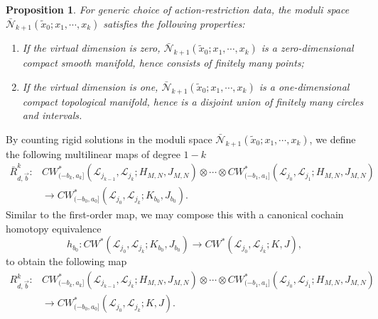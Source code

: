 \documentclass{amsart}
\newtheorem{proposition}[theorem]{Proposition}
\numberwithin{equation}{section}
\numberwithin{figure}{section}
\begin{document}
\begin{proposition}
	For generic choice of action-restriction data, the moduli space $\bar{\mathcal{N}}_{k+1}(\tilde{x}_{0}; x_{1}, \cdots, x_{k})$ satisfies the following properties:
\begin{enumerate}[label=(\roman*)]

\item If the virtual dimension is zero, $\bar{\mathcal{N}}_{k+1}(\tilde{x}_{0}; x_{1}, \cdots, x_{k})$ is a zero-dimensional compact smooth manifold, hence consists of finitely many points;

\item If the virtual dimension is one, $\bar{\mathcal{N}}_{k+1}(\tilde{x}_{0}; x_{1}, \cdots, x_{k})$ is a one-dimensional compact topological manifold, hence is a disjoint union of finitely many circles and intervals.

\end{enumerate}
\end{proposition}

	 By counting rigid solutions in the moduli space $\bar{\mathcal{N}}_{k+1}(\tilde{x}_{0}; x_{1}, \cdots, x_{k})$, we define the following multilinear maps of degree $1-k$
\begin{equation} \label{higher order maps of the action-restriction functor, on truncated Floer complexes}
\begin{split}
\bar{R}_{d, \vec{b}}^{k}: &CW^{*}_{(-b_{k}, a_{k}]}(\mathcal{L}_{j_{k-1}}, \mathcal{L}_{j_{k}}; H_{M, N}, J_{M, N}) \otimes \cdots \otimes CW^{*}_{(-b_{1}, a_{1}]}(\mathcal{L}_{j_{0}}, \mathcal{L}_{j_{1}}; H_{M, N}, J_{M, N})\\
&\to CW^{*}_{(-b_{0}, a_{0}]}(\mathcal{L}_{j_{0}}, \mathcal{L}_{j_{k}}; K_{b_{0}}, J_{b_{0}}).
\end{split}
\end{equation}
Similar to the first-order map, we may compose this with a canonical cochain homotopy equivalence
\begin{equation*}
h_{b_{0}}: CW^{*}(\mathcal{L}_{j_{0}}, \mathcal{L}_{j_{k}}; K_{b_{0}}, J_{b_{0}}) \to CW^{*}(\mathcal{L}_{j_{0}}, \mathcal{L}_{j_{k}}; K, J),
\end{equation*}
to obtain the following map
\begin{equation}\label{higher order maps of the action-restriction functor, on truncated Floer complexes, with independent Hamiltonian and almost complex structure}
\begin{split}
R_{d, \vec{b}}^{k}: &CW^{*}_{(-b_{k}, a_{k}]}(\mathcal{L}_{j_{k-1}}, \mathcal{L}_{j_{k}}; H_{M, N}, J_{M, N}) \otimes \cdots \otimes CW^{*}_{(-b_{1}, a_{1}]}(\mathcal{L}_{j_{0}}, \mathcal{L}_{j_{1}}; H_{M, N}, J_{M, N})\\
&\to CW^{*}_{(-b_{0}, a_{0}]}(\mathcal{L}_{j_{0}}, \mathcal{L}_{j_{k}}; K, J).
\end{split}
\end{equation}
\end{document}
